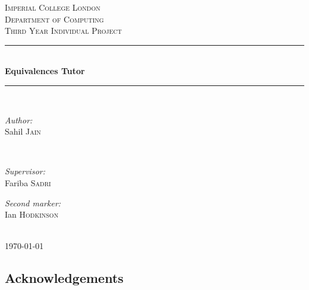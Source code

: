 \documentclass{report}
\begin{document}

\begin{titlepage}
\newcommand{\HRule}{\rule{\linewidth}{0.5mm}}
\center
\textsc{\LARGE Imperial College London} \\[0.5cm]
\textsc{\Large Department of Computing} \\[0.5cm]
\textsc{\large Third Year Individual Project} \\[1.5cm]
\HRule \\[0.3cm]
{\huge \bfseries Equivalences Tutor} \\[0.3cm]
\HRule \\[1.5cm]

\begin{minipage}{0.4\textwidth}
\begin{flushleft} \large \emph{Author:} \\
Sahil \textsc{Jain}
\end{flushleft}
\end{minipage}~
\begin{minipage}{0.4\textwidth}
\begin{flushright} \large \emph{Supervisor:} \\
Fariba \textsc{Sadri}
\end{flushright}
\begin{flushright} \large \emph{Second marker:} \\
Ian \textsc{Hodkinson}
\end{flushright}
\end{minipage}\\[4cm]
{\large \today}\\[3cm]
\vfill
\end{titlepage}


\begin{abstract}
\end{abstract}



\subsection*{\centering Acknowledgements}
\end{document}
